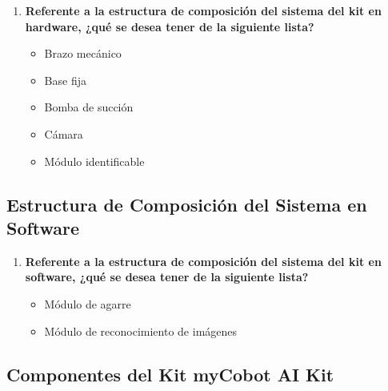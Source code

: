 \begin{enumerate}[start=12]
    \item \textbf{Referente a la estructura de composición del sistema del kit en hardware, ¿qué se desea tener de la siguiente lista?}
    
    \begin{itemize}
        \item Brazo mecánico
        \item Base fija
        \item Bomba de succión
        \item Cámara
        \item Módulo identificable
    \end{itemize}
\end{enumerate}

\subsection{Estructura de Composición del Sistema en Software}

\begin{enumerate}[start=13]
    \item \textbf{Referente a la estructura de composición del sistema del kit en software, ¿qué se desea tener de la siguiente lista?}
    
    \begin{itemize}
        \item Módulo de agarre
        \item Módulo de reconocimiento de imágenes
    \end{itemize}
\end{enumerate}

\subsection{Componentes del Kit myCobot AI Kit}

